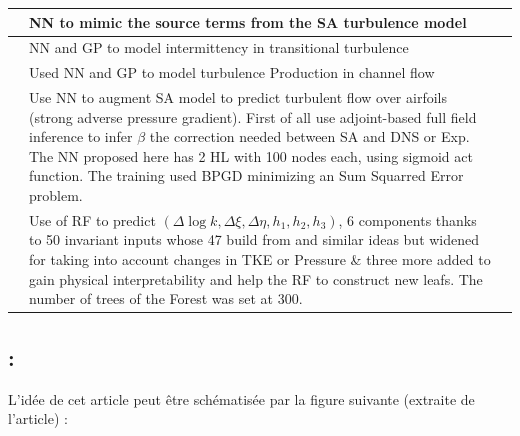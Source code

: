 \documentclass[a4paper,12pt]{report}
\newcommand{\bepar}[1]{
	\left( #1 \right)  
}
\newcommand\bk{\color{black}}
\newcommand\navy{\color{navy}}
\newcommand\red{\color{red}}
\numberwithin{equation}{section} %
\begin{document}
\begin{longtable}{| M{.20\textwidth} | M{.80\textwidth} |N}
		\textbf{\cite{tracey2015machine}} & \red NN \bk to \navy mimic the source terms from the SA turbulence model \bk &\\[1.5cm] \hline
				
		\textbf{\cite{duraisamy2015new}} & \red NN and GP \bk to \navy model intermittency in transitional turbulence \bk &\\[1.5cm] \hline 		
		
		\textbf{\cite{zhang2015machine}} & Used \red NN and GP \bk to \navy model turbulence Production in channel flow \bk &\\[1.5cm] \hline
		
		\textbf{\cite{singh2017machine}} &Use \red NN \bk to augment SA model to predict turbulent flow over airfoils (strong adverse pressure gradient). First of all use adjoint-based full field inference to infer $\beta$ the correction needed between SA and DNS or Exp. The \red NN \bk proposed here has 2 HL with 100 nodes each, using sigmoid act function. The training used BPGD minimizing an Sum Squarred Error problem.&\\[3cm] \hline 
		
		\textbf{\cite{wu2018data}} & Use of \red RF \bk to predict $\bepar{\Delta \log k, \Delta \xi, \Delta \eta, h_1, h_2, h_3}$, 6 components thanks to 50 invariant inputs whose 47 build from \cite{pope1975more} and \cite{ling2016reynolds} similar ideas but widened for taking into account changes in TKE or Pressure \& three more added to gain physical interpretability and help the RF to construct new leafs. The number of trees of the Forest was set at 300. &\\[2cm]\hline
		
\end{longtable}

\pagebreak
\raggedright
\subsection*{\textbf{\cite{singh2017machine}} : }
\noindent L'idée de cet article peut être schématisée par la figure suivante (extraite de l'article) :
\end{document}
